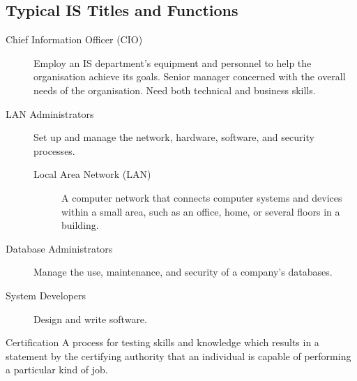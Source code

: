 \documentclass[\main/notes.tex]{subfiles}
\begin{document}
			\subsection{Typical IS Titles and Functions}
				\begin{description}
					\item[Chief Information Officer (CIO)] Employ an IS department's equipment and personnel to help the organisation achieve its goals. Senior manager concerned with the overall needs of the organisation. Need both technical and business skills.
					\item[LAN Administrators] Set up and manage the network, hardware, software, and security processes.
						\begin{description}
							\item[Local Area Network (LAN)] A computer network that connects computer systems and devices within a small area, such as an office, home, or several floors in a building.
						\end{description}
					\item[Database Administrators] Manage the use, maintenance, and security of a company's databases.
					\item[System Developers] Design and write software.
				\end{description}
				\begin{definition}{Certification}
					A process for testing skills and knowledge which results in a statement by the certifying authority that an individual is capable of performing a particular kind of job.
				\end{definition}
\end{document}
